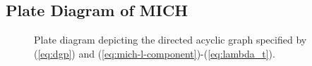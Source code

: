 \subsection{Plate Diagram of MICH}
\label{app:plate-diagram}

\begin{figure}
    \centering
    
    \caption{Plate diagram depicting the directed acyclic graph specified by (\ref{eq:dgp}) and (\ref{eq:mich-l-component})-(\ref{eq:lambda_t}).}
    \label{fig:plate-diagram}
\end{figure}
